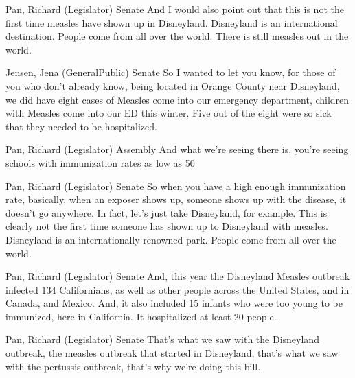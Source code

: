 \begin{result}{12.548020032233172}{Pan, Richard (Legislator) Senate}
And I would also point out that this is not the first time measles have shown up in Disneyland. Disneyland is an international destination. People come from all over the world. There is still measles out in the world.
\end{result}

\begin{result}{11.647790196985587}{Jensen, Jena (GeneralPublic) Senate}
So I wanted to let you know, for those of you who don't already know, being located in Orange County near Disneyland, we did have eight cases of Measles come into our emergency department, children with Measles come into our ED this winter. Five out of the eight were so sick that they needed to be hospitalized.
\end{result}

\begin{result}{10.309882024303807}{Pan, Richard (Legislator) Assembly}
And what we're seeing there is, you're seeing schools with immunization rates as low as 50%
\end{result}

\begin{result}{10.181845950621415}{Pan, Richard (Legislator) Senate}
So when you have a high enough immunization rate, basically, when an exposer shows up, someone shows up with the disease, it doesn't go anywhere. In fact, let's just take Disneyland, for example. This is clearly not the first time someone has shown up to Disneyland with measles. Disneyland is an internationally renowned park. People come from all over the world.
\end{result}

\begin{result}{9.883816091413054}{Pan, Richard (Legislator) Senate}
And, this year the Disneyland Measles outbreak infected 134 Californians, as well as other people across the United States, and in Canada, and Mexico. And, it also included 15 infants who were too young to be immunized, here in California.  It hospitalized at least 20 people.
\end{result}

\begin{result}{9.342610750665486}{Pan, Richard (Legislator) Senate}
That's what we saw with the Disneyland outbreak, the measles outbreak that started in Disneyland, that's what we saw with the pertussis outbreak, that's why we're doing this bill.
\end{result}


